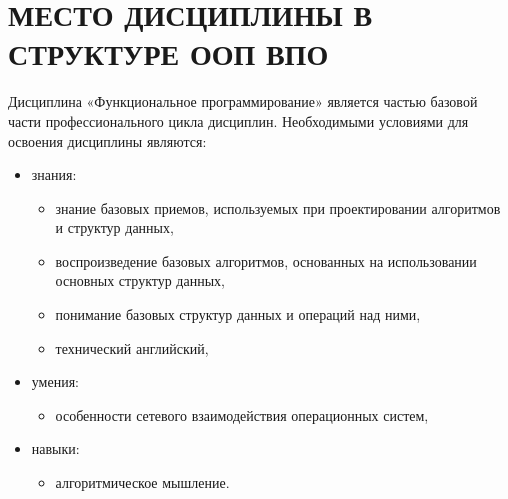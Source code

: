 \section{МЕСТО ДИСЦИПЛИНЫ В СТРУКТУРЕ ООП ВПО}
Дисциплина «Функциональное программирование» является частью базовой части профессионального цикла дисциплин.
Необходимыми условиями для освоения дисциплины являются:
\begin{itemize}
\item знания:
\begin{itemize}
\item знание базовых приемов, используемых при проектировании алгоритмов и структур данных,\item воспроизведение базовых алгоритмов, основанных на использовании основных структур данных,\item понимание базовых структур данных и операций над ними,\item технический английский,
\end{itemize}
\item умения:
\begin{itemize}
\item особенности сетевого взаимодействия операционных систем,
\end{itemize}
\item навыки:
\begin{itemize}
\item алгоритмическое мышление.
\end{itemize}
\end{itemize}


